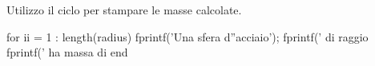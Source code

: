 \vspace{1em}
\begin{par}
\begin{flushleft}
Utilizzo il ciclo per stampare le masse calcolate.
\end{flushleft}
\end{par}

\begin{matlabcode}
for ii = 1 : length(radius)
    fprintf('Una sfera d''acciaio');
    fprintf(' di raggio %
    fprintf(' ha massa di %
end
\end{matlabcode}
